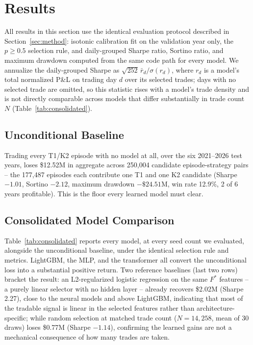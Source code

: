 \documentclass[sigconf,review,anonymous]{acmart}
\begin{document}
\section{Results}
\label{sec:results}

All results in this section use the identical evaluation protocol described in Section~\ref{sec:method}: isotonic calibration fit on the validation year only, the $p \ge 0.5$ selection rule, and daily-grouped Sharpe ratio, Sortino ratio, and maximum drawdown computed from the same code path for every model. We annualize the daily-grouped Sharpe as $\sqrt{252}\,\bar{r}_d/\sigma(r_d)$, where $r_d$ is a model's total normalized P\&L on trading day $d$ over its selected trades; days with no selected trade are omitted, so this statistic rises with a model's trade density and is not directly comparable across models that differ substantially in trade count $N$ (Table~\ref{tab:consolidated}).

\subsection{Unconditional Baseline}
Trading every T1/K2 episode with no model at all, over the six 2021--2026 test years, loses \$12.52M in aggregate across 250{,}004 candidate episode-strategy pairs -- the 177{,}487 episodes each contribute one T1 and one K2 candidate (Sharpe $-1.01$, Sortino $-2.12$, maximum drawdown $-\$24.51$M, win rate 12.9\%, 2 of 6 years profitable). This is the floor every learned model must clear.

\subsection{Consolidated Model Comparison}
\label{sec:seedcount}
Table~\ref{tab:consolidated} reports every model, at every seed count we evaluated, alongside the unconditional baseline, under the identical selection rule and metrics. LightGBM, the MLP, and the transformer all convert the unconditional loss into a substantial positive return. Two reference baselines (last two rows) bracket the result: an L2-regularized logistic regression on the same $F^{\ast}$ features -- a purely linear selector with no hidden layer -- already recovers \$2.02M (Sharpe 2.27), close to the neural models and above LightGBM, indicating that most of the tradable signal is linear in the selected features rather than architecture-specific; while random selection at matched trade count ($N{=}14{,}258$, mean of 30 draws) loses \$0.77M (Sharpe $-1.14$), confirming the learned gains are not a mechanical consequence of how many trades are taken.
\end{document}
